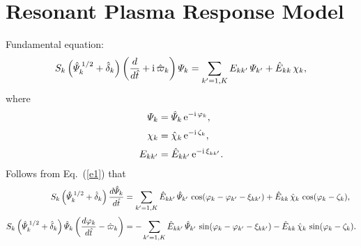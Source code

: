\documentclass[12pt]{article}
\begin{document}
\section{Resonant Plasma Response Model}
Fundamental equation:
\begin{equation}\label{e1}
S_k\left(\hat{\mit\Psi}_k^{\,1/2} +\hat{\delta}_k\right)\left(\frac{d}{d\hat{t}} + {\rm i}\,\hat{\varpi}_k\right){\mit\Psi}_k = \sum_{k'=1,K}E_{kk'}\,{\mit\Psi}_{k'}
+ \hat{E}_{kk}\,\chi_k,
\end{equation}
where
\begin{align}
{\mit\Psi}_k &= \hat{\mit\Psi}_k\,{\rm e}^{-{\rm i}\,\varphi_k},\\[0.5ex]
\chi_k &= \hat{\chi}_k\,{\rm e}^{-{\rm i}\,\zeta_k},\\[0.5ex]
E_{kk'} &=\hat{E}_{kk'}\,{\rm e}^{-{\rm i}\,\xi_{kk'}}.
\end{align}
Follows from Eq.~(\ref{e1}) that
\begin{align}
S_k\left(\hat{\mit\Psi}_k^{\,1/2} +\hat{\delta}_k\right)\frac{d\hat{\mit\Psi}_k}{d\hat{t}}&= \sum_{k'=1,K}\hat{E}_{kk'}\,\hat{\mit\Psi}_{k'}\,\cos(\varphi_k-\varphi_{k'}-\xi_{kk'})
+ \hat{E}_{kk}\,\hat{\chi}_k\,\cos(\varphi_k-\zeta_k),\\[0.5ex]
S_k\left(\hat{\mit\Psi}_k^{\,1/2} +\hat{\delta}_k\right)\hat{\mit\Psi}_k\left(\frac{d\varphi_k}{d\hat{t}}-\hat{\varpi}_k\right)&=- \sum_{k'=1,K}\hat{E}_{kk'}\,\hat{\mit\Psi}_{k'}\,\sin(\varphi_k-\varphi_{k'}-\xi_{kk'})-
 \hat{E}_{kk}\,\hat{\chi}_k\,\sin(\varphi_k-\zeta_k).
\end{align}
\end{document}
